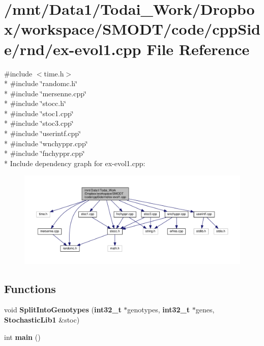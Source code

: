 \section{/mnt/\-Data1/\-Todai\-\_\-\-Work/\-Dropbox/workspace/\-S\-M\-O\-D\-T/code/cpp\-Side/rnd/ex-\/evol1.cpp File Reference}
\label{rnd_2ex-evol1_8cpp}
{\ttfamily \#include $<$time.\-h$>$}\\*
{\ttfamily \#include \char`\"{}randomc.\-h\char`\"{}}\\*
{\ttfamily \#include \char`\"{}mersenne.\-cpp\char`\"{}}\\*
{\ttfamily \#include \char`\"{}stocc.\-h\char`\"{}}\\*
{\ttfamily \#include \char`\"{}stoc1.\-cpp\char`\"{}}\\*
{\ttfamily \#include \char`\"{}stoc3.\-cpp\char`\"{}}\\*
{\ttfamily \#include \char`\"{}userintf.\-cpp\char`\"{}}\\*
{\ttfamily \#include \char`\"{}wnchyppr.\-cpp\char`\"{}}\\*
{\ttfamily \#include \char`\"{}fnchyppr.\-cpp\char`\"{}}\\*
Include dependency graph for ex-\/evol1.cpp\-:\nopagebreak
\begin{figure}[H]
\begin{center}
\leavevmode
\includegraphics[width=350pt]{rnd_2ex-evol1_8cpp__incl}
\end{center}
\end{figure}
\subsection*{Functions}
\begin{DoxyCompactItemize}
\item 
void {\bf Split\-Into\-Genotypes} ({\bf int32\-\_\-t} $\ast$genotypes, {\bf int32\-\_\-t} $\ast$genes, {\bf Stochastic\-Lib1} \&stoc)
\item 
int {\bf main} ()
\end{DoxyCompactItemize}



